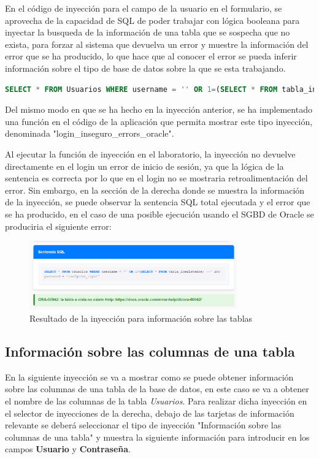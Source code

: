 \documentclass[a4paper,12pt]{article}
\begin{document}
En el código de inyección para el campo de la usuario en el formulario, 
se aprovecha de la capacidad de SQL de poder trabajar con lógica booleana para inyectar la busqueda de la información de una tabla
que se sospecha que no exista, para forzar al sistema que devuelva un error y muestre la información del error que se ha producido,
lo que hace que al conocer el error se pueda inferir información sobre el tipo de base de datos sobre la que se esta trabajando.

\begin{lstlisting}[language=SQL]
    SELECT * FROM Usuarios WHERE username = '' OR 1=(SELECT * FROM tabla_inexistente) --' AND password = 'cualquier_input'
\end{lstlisting}

Del mismo modo en que se ha hecho en la inyección anterior, 
se ha implementado una función en el código de la aplicación que permita mostrar este tipo inyección, denominada "login\_inseguro\_errors\_oracle".

Al ejecutar la función de inyección en el laboratorio, la inyección no devuelve directamente en el login un error de inicio de sesión,
ya que la lógica de la sentencia es correcta por lo que en el login no se mostraria retroalimentación del error. Sin embargo,
en la sección de la derecha donde se muestra la información de la inyección, se puede observar la sentencia SQL total ejecutada y el error que se ha producido,
en el caso de una posible ejecución usando el SGBD de Oracle se produciria el siguiente error:

\begin{figure}[H]
    \centering
    \includegraphics[width=0.8\textwidth]{Imagenes/error6.png}
    \caption{Resultado de la inyección para información sobre las tablas}
\end{figure}

\subsection{Información sobre las columnas de una tabla}

En la siguiente inyección se va a mostrar como se puede obtener información sobre las columnas de una tabla de la base de datos,
en este caso se va a obtener el nombre de las columnas de la tabla \textit{Usuarios}.
Para realizar dicha inyección en el selector de inyecciones de la derecha,
debajo de las tarjetas de información relevante se deberá seleccionar el tipo de inyección "Información sobre las columnas de una tabla"
y muestra la siguiente información para introducir en los campos \textbf{Usuario} y \textbf{Contraseña}.
\end{document}
